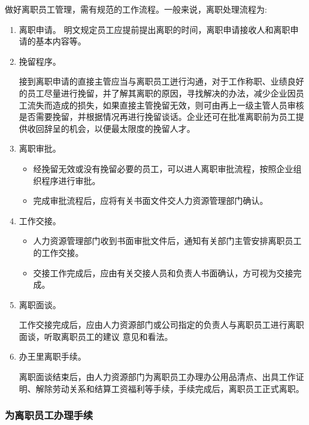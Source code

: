    做好离职员工管理，需有规范的工作流程。一般来说，离职处理流程为:
    \begin{enumerate}
        \item 离职申请。
        明文规定员工应提前提出离职的时间，离职申请接收人和离职申请的基本内容等。

        \item 挽留程序。

        接到离职申请的直接主管应当与离职员工迸行沟通，对于工作称职、业绩良好的员工尽量进行挽留，并了解其离职的原因，寻找解决的办法，减少企业因员工流失而造成的损失，如果直接主管挽留无效，则可由再上一级主管人员审核是否需要挽留，并根据情况再进行挽留谈话。企业还可在批准离职前为员工提供收回辞呈的机会，以便最太限度的挽留人才。

        \item 离职审批。
            \begin{itemize}
                \item 经挽留无效或没有挽留必要的员工，可以进人离职审批流程，按照企业组织程序进行审批。

                \item 完成审批流程后，应将有关书面文件交人力资源管理部门确认。
            \end{itemize}

        \item 工作交接。

            \begin{itemize}
                \item 人力资源管理部门收到书面审批文件后，通知有关部门主管安排离职员工的工作交接。

                \item 交接工作完成后，应由有关交接人员和负责人书面确认，方可视为交接完成。
            \end{itemize}

        \item 离职面谈。

        工作交接完成后，应由人力资源部门或公司指定的负责人与离职员工进行离职面谈，听取离职员工的建议 意见和看法。

        \item 办王里离职手续。

        离职面谈结束后，由人力资源部门为离职员工办理办公用品清点、出具工作证明、解除劳动关系和结算工资福利等手续，手续完成后，离职员工正式离职。

    \end{enumerate}

\subsubsection {为离职员工办理手续}

